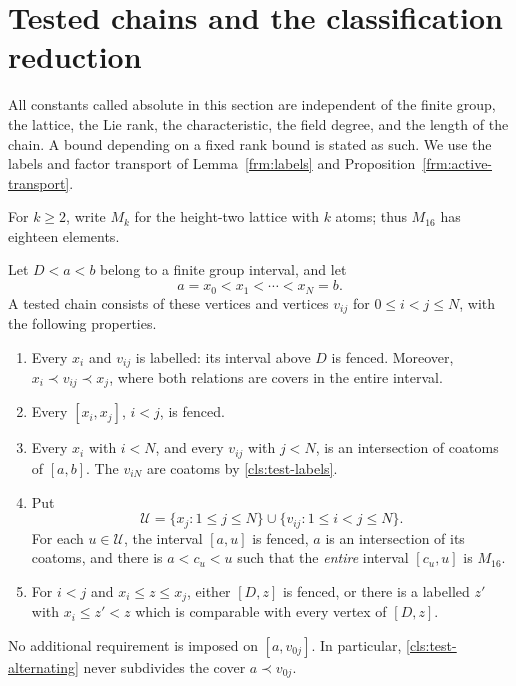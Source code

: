 \section{Tested chains and the classification reduction}
\label{sec:classification}
\label{cls:section}

All constants called absolute in this section are independent of the finite
group, the lattice, the Lie rank, the characteristic, the field degree, and
the length of the chain.  A bound depending on a fixed rank bound is stated
as such.  We use the labels and factor transport of
Lemma~\ref{frm:labels} and Proposition~\ref{frm:active-transport}.

For $k\ge2$, write $M_k$ for the height-two lattice with $k$ atoms;
thus $M_{16}$ has eighteen elements.

\begin{definition}\label{cls:tested-chain}
Let $D<a<b$ belong to a finite group interval, and let
\[
 a=x_0<x_1<\cdots <x_N=b.
\]
A tested chain consists of these vertices and vertices $v_{ij}$ for
$0\leq i<j\leq N$, with the following properties.
\begin{enumerate}[label=\textup{(T\arabic*)},ref=T\arabic*]
\item\label{cls:test-labels}
Every $x_i$ and $v_{ij}$ is labelled: its interval above $D$ is fenced.
Moreover, $x_i\prec v_{ij}\prec x_j$, where both relations are covers in
the entire interval.
\item\label{cls:test-fences}
Every $[x_i,x_j]$, $i<j$, is fenced.
\item\label{cls:test-saturation}
Every $x_i$ with $i<N$, and every $v_{ij}$ with $j<N$, is an intersection
of coatoms of $[a,b]$.  The $v_{iN}$ are coatoms by
\ref{cls:test-labels}.
\item\label{cls:test-alternating}
Put
\[
 \mathcal U=\{x_j:1\leq j\leq N\}
 \mathbin{\cup}\{v_{ij}:1\leq i<j\leq N\}.
\]
For each $u\in\mathcal U$, the interval $[a,u]$ is fenced, $a$ is an
intersection of its coatoms, and there is $a<c_u<u$ such that the
\emph{entire} interval $[c_u,u]$ is $M_{16}$.
\item\label{cls:test-normal}
For $i<j$ and $x_i\leq z\leq x_j$, either $[D,z]$ is fenced, or there is
a labelled $z'$ with $x_i\leq z'<z$ which is comparable with every vertex
of $[D,z]$.
\end{enumerate}
No additional requirement is imposed on $[a,v_{0j}]$.  In particular,
\ref{cls:test-alternating} never subdivides the cover $a\prec v_{0j}$.
\end{definition}

